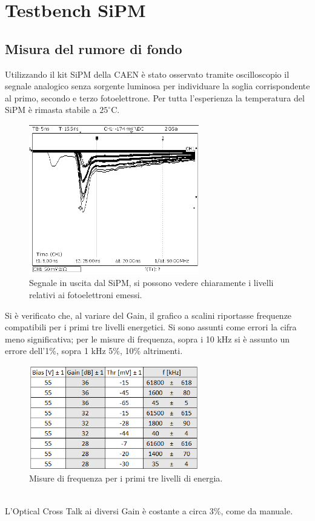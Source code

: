 \documentclass[11pt]{article} %
\begin{document}
\section{Testbench SiPM} 
\subsection{Misura del rumore di fondo}
Utilizzando il kit SiPM della CAEN è stato osservato tramite oscilloscopio il segnale analogico senza sorgente luminosa per individuare la soglia corrispondente al primo, secondo e terzo fotoelettrone. Per tutta l'esperienza la temperatura del SiPM è rimasta stabile a $25^{\circ}$C.
\begin{figure}[h!]
\begin{center}
\includegraphics[width=280px]{img/SIPM01.PNG}
\caption{Segnale in uscita dal SiPM, si possono vedere chiaramente i livelli relativi ai fotoelettroni emessi.}
\label{fig:Sipm}
\end{center}
\end{figure}
\newpage
Si è verificato che, al variare del Gain, il grafico a scalini riportasse frequenze compatibili per i primi tre livelli energetici. Si sono assunti come errori la cifra meno significativa; per le misure di frequenza, sopra i 10 kHz si è assunto un errore dell'1\%, sopra 1 kHz 5\%, 10\% altrimenti.
\begin{figure}[h!]
\begin{center}
\includegraphics[width=280px]{img/tabnoise.png}
\caption{Misure di frequenza per i primi tre livelli di energia.}
\label{fig:Sipm}
\end{center}
\end{figure}
\\
L'Optical Cross Talk ai diversi Gain è costante a circa 3\%,  come da manuale.
\end{document}
